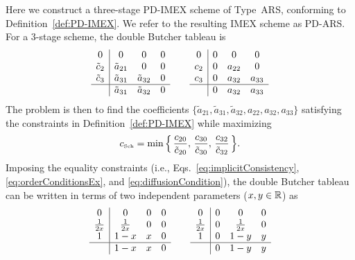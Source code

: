 Here we construct a three-stage PD-IMEX scheme of Type~ARS, conforming to Definition~\ref{def:PD-IMEX}.  
We refer to the resulting IMEX scheme as PD-ARS.  
For a 3-stage scheme, the double Butcher tableau is
\begin{equation}
  \begin{array}{c | c c c}
  	         0           & 0                 & 0                   & 0  \\
  	\tilde{c}_{2} & \tilde{a}_{21} & 0                   & 0  \\
  	\tilde{c}_{3} & \tilde{a}_{31} & \tilde{a}_{32} & 0  \\ \hline
  	                   & \tilde{a}_{31} & \tilde{a}_{32} & 0
  \end{array}
  \qquad
  \begin{array}{c | c c c}
  	     0  & 0  & 0         & 0          \\
  	c_{2} & 0 & a_{22} & 0          \\
  	c_{3} & 0 & a_{32} & a_{33}  \\ \hline
  	         & 0 & a_{32} & a_{33}
  \end{array}
\end{equation}
The problem is then to find the coefficients $\{ \tilde{a}_{21}, \tilde{a}_{31}, \tilde{a}_{32}, a_{22}, a_{32}, a_{33} \}$ satisfying the constraints in Definition~\ref{def:PD-IMEX} while maximizing
\begin{equation}
  c_{\mbox{\tiny Sch}} = \min \Big\{\, \dfrac{c_{20}}{\tilde{c}_{20}},\, \dfrac{c_{30}}{\tilde{c}_{30}},\, \dfrac{c_{32}}{\tilde{c}_{32}} \,\Big\}.  
\end{equation}
Imposing the equality constraints (i.e., Eqs.~\eqref{eq:implicitConsistency}, \eqref{eq:orderConditionsEx}, and \eqref{eq:diffusionCondition}), the double Butcher tableau can be written in terms of two independent parameters ($x,y\in\mathbb{R}$) as
\begin{equation}
  \begin{array}{c | c c c}
  	     0       & 0            & 0 & 0 \\
  	\frac{1}{2x} & \frac{1}{2x} & 0 & 0 \\
  	     1       & 1-x          & x & 0 \\ \hline
  	             & 1-x          & x & 0
  \end{array}
  \qquad
  \begin{array}{c | c c c}
  	     0       & 0 & 0            & 0 \\
  	\frac{1}{2x} & 0 & \frac{1}{2x} & 0 \\
  	     1       & 0 & 1-y          & y \\ \hline
  	             & 0 & 1-y          & y
  \end{array}
\end{equation}
